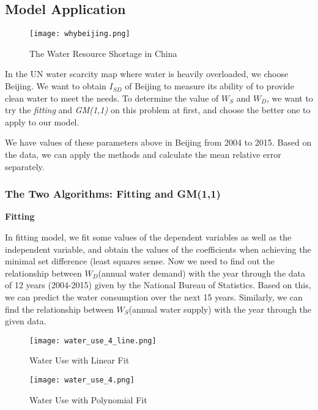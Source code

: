 \documentclass{mcmthesis}
\begin{document}
\subsection{Model Application}

\begin{figure}[h]
\small
\centering
\texttt{[image: whybeijing.png]}
\caption{The Water Resource Shortage in China} \label{fig:The Water Resource Shortage in China}
\end{figure}


\par In the UN water scarcity map where water is heavily overloaded, we choose Beijing.
We want to obtain $I_{SD}$ of Beijing to measure its ability of to provide clean water to meet the needs. To determine the value of $W_S$ and $W_D$, we want to try the \emph{fitting} and \emph{GM(1,1)} on this problem at first, and choose the better one to apply to our model.
\par We have values of these parameters above in Beijing from 2004 to 2015. Based on the data, we can apply the methods and calculate the mean relative error separately.
 
\subsubsection{The Two Algorithms: Fitting and GM(1,1)}
\textbf{Fitting} 
\par In fitting model, we fit some values of the dependent variables as well as the independent variable, and obtain the values of the coefficients when achieving the minimal set difference (least squares sense. Now we need to find out the relationship between $W_D$(annual water demand) with the year through the data of 12 years (2004-2015) given by the National Bureau of Statistics. Based on this, we can predict the water consumption over the next 15 years. Similarly, we can find the relationship between $W_S$(annual water supply) with the year through the given data.

\begin{figure}[htbp]  
\begin{minipage}[t]{0.5\textwidth}
\centering  
\texttt{[image: water\_use\_4\_line.png]}  
\caption{Water Use with Linear Fit} 
\end{minipage}
\begin{minipage}[t]{0.5\textwidth}  
\centering  
\texttt{[image: water\_use\_4.png]}  
\caption{Water Use with Polynomial Fit}  
\end{minipage}  
\end{figure} 
\end{document}
